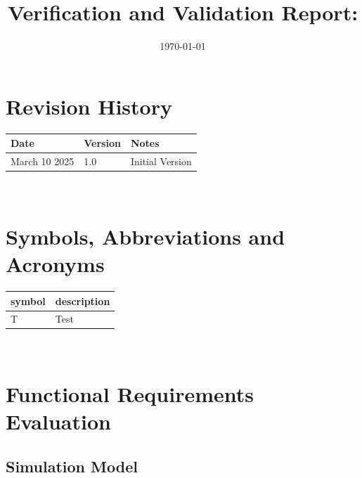 \documentclass[12pt, titlepage]{article}
\begin{document}
\title{Verification and Validation Report: \progname} 
\author{\authname}
\date{\today}
	
\maketitle


\section{Revision History}

\begin{tabularx}{\textwidth}{p{3cm}p{2cm}X}
\toprule {\bf Date} & {\bf Version} & {\bf Notes}\\
\midrule
March 10 2025 & 1.0 & Initial Version\\

\bottomrule
\end{tabularx}

~\newpage

\section{Symbols, Abbreviations and Acronyms}

\renewcommand{\arraystretch}{1.2}
\begin{tabular}{l l} 
  \toprule		
  \textbf{symbol} & \textbf{description}\\
  \midrule 
  T & Test\\
  \bottomrule
\end{tabular}\\


\newpage

\tableofcontents

\listoftables %

\listoffigures %

\newpage


\section{Functional Requirements Evaluation}

\subsection{Simulation Model}
\end{document}
